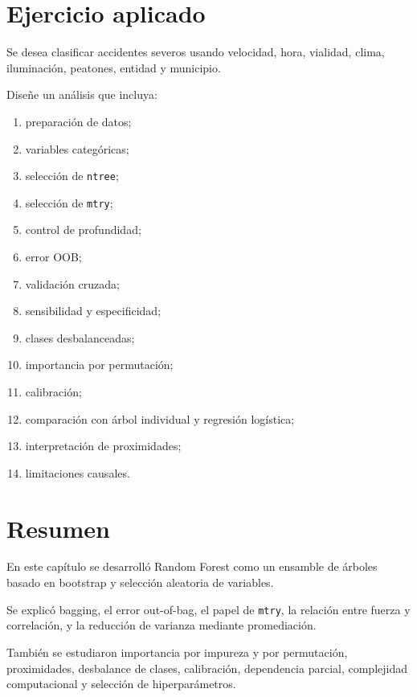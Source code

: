 \documentclass[
  spanish,
  10.5pt,
  letterpaper,
  DIV=11,
  numbers=noendperiod,
  oneside,
  open=any]{scrreprt}
\providecommand{\tightlist}{%
  \setlength{\itemsep}{0pt}\setlength{\parskip}{0pt}}
\theoremstyle{definition}
\theoremstyle{definition}
\theoremstyle{plain}
\theoremstyle{remark}
\begin{document}
\section*{Ejercicio aplicado}\label{ejercicio-aplicado-10}


Se desea clasificar accidentes severos usando velocidad, hora, vialidad,
clima, iluminación, peatones, entidad y municipio.

Diseñe un análisis que incluya:

\begin{enumerate}
\def\labelenumi{\arabic{enumi}.}
\tightlist
\item
  preparación de datos;
\item
  variables categóricas;
\item
  selección de \texttt{ntree};
\item
  selección de \texttt{mtry};
\item
  control de profundidad;
\item
  error OOB;
\item
  validación cruzada;
\item
  sensibilidad y especificidad;
\item
  clases desbalanceadas;
\item
  importancia por permutación;
\item
  calibración;
\item
  comparación con árbol individual y regresión logística;
\item
  interpretación de proximidades;
\item
  limitaciones causales.
\end{enumerate}

\section*{Resumen}\label{resumen-12}


En este capítulo se desarrolló Random Forest como un ensamble de árboles
basado en bootstrap y selección aleatoria de variables.

Se explicó bagging, el error out-of-bag, el papel de \texttt{mtry}, la
relación entre fuerza y correlación, y la reducción de varianza mediante
promediación.

También se estudiaron importancia por impureza y por permutación,
proximidades, desbalance de clases, calibración, dependencia parcial,
complejidad computacional y selección de hiperparámetros.
\end{document}
